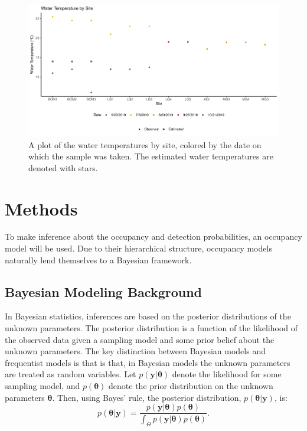 \documentclass[12pt]{article}\usepackage[]{graphicx}\usepackage[]{color}
\makeatletter
\def\maxwidth{ %
  \ifdim\Gin@nat@width>\linewidth
    \linewidth
  \else
    \Gin@nat@width
  \fi
}
\newenvironment{knitrout}{}{} %
\def\maxwidth{ %
  \ifdim\Gin@nat@width>\linewidth
    \linewidth
  \else
    \Gin@nat@width
  \fi
}
\newenvironment{knitrout}{}{} %
\makeatother
\begin{document}
\begin{figure}[]
\begin{knitrout}
\color{fgcolor}

{\centering \includegraphics[width=\maxwidth]{figure/eDNA_visualization_temp-1} 

}



\end{knitrout}
\caption{A plot of the water temperatures by site, colored by the date on which the sample was taken. The estimated water temperatures are denoted with stars.}
\label{fig:eDNA_temp}
\end{figure}

\section{Methods}

To make inference about the occupancy and detection probabilities, an occupancy model will be used. Due to their hierarchical structure, occupancy models naturally lend themselves to a Bayesian framework. 

\subsection{Bayesian Modeling Background}

In Bayesian statistics, inferences are based on the posterior distributions of the unknown parameters. The posterior distribution is a function of the likelihood of the observed data given a sampling model and some prior belief about the unknown parameters. The key distinction between Bayesian models and frequentist models is that is that, in Bayesian models the unknown parameters are treated as random variables. Let $p(\bm{y}|\bm{\theta})$ denote the likelihood for some sampling model, and $p(\bm{\theta})$ denote the prior distribution on the unknown parameters $\bm{\theta}$. Then, using Bayes' rule, the posterior distribution, $p(\bm{\theta}|\bm{y})$, is: 
$$p(\bm{\theta}|\bm{y}) = \frac{p(\bm{y}|\bm{\theta})p(\bm{\theta})}{\int_\Theta p(\bm{y}|\bm{\theta})p(\bm{\theta})}.$$
\end{document}
